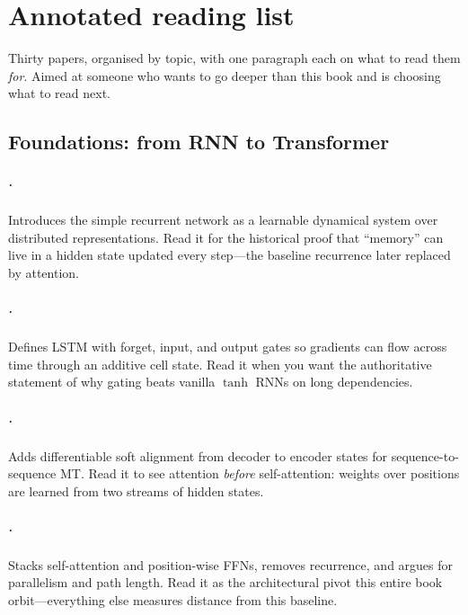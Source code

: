 \chapter{Annotated reading list}
\label{app:reading}

Thirty papers, organised by topic, with one paragraph each on what to read
them \emph{for}. Aimed at someone who wants to go deeper than this book
and is choosing what to read next.

\section*{Foundations: from RNN to Transformer}

\paragraph{\citet{elman1990finding}.}
Introduces the simple recurrent network as a learnable dynamical system over
distributed representations. Read it for the historical proof that ``memory''
can live in a hidden state updated every step---the baseline recurrence later
replaced by attention.

\paragraph{\citet{hochreiter1997lstm}.}
Defines LSTM with forget, input, and output gates so gradients can flow across
time through an additive cell state. Read it when you want the authoritative
statement of why gating beats vanilla \(\tanh\) RNNs on long dependencies.

\paragraph{\citet{bahdanau2014attention}.}
Adds differentiable soft alignment from decoder to encoder states for
sequence-to-sequence MT. Read it to see attention \emph{before} self-attention:
weights over positions are learned from two streams of hidden states.

\paragraph{\citet{vaswani2017attention}.}
Stacks self-attention and position-wise FFNs, removes recurrence, and argues for
parallelism and path length. Read it as the architectural pivot this entire book
orbit---everything else measures distance from this baseline.

